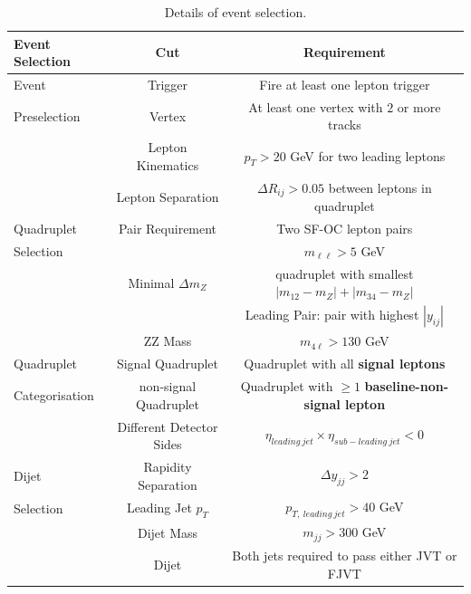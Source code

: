 \begin{table}[!htbp]
    \centering
        \caption{Details of event selection.\label{tab:EventSelection}}
        \begin{tabular}{|| l || c | c ||}
        \hline
        Event Selection         & Cut                   & Requirement                                                       \\
        \hline\hline
        Event               & Trigger                   &  Fire at least one lepton trigger                                     \\
        Preselection                & Vertex                    & At least one vertex with $2$ or more tracks                               \\
        \hline  
                    & Lepton Kinematics         & $p_{T} > 20$ GeV for two leading leptons                     \\
                    & Lepton Separation         & $\Delta R_{ij} > 0.05$ between leptons in quadruplet      \\
        Quadruplet  & Pair Requirement          & Two SF-OC lepton pairs                                            \\
        Selection   &                       & $m_{\ell\ell} > 5$ GeV                                    \\
                    & Minimal $\Delta m_{Z}$    & quadruplet with smallest $|m_{12} - m_{Z} | + |m_{34} - m_{Z} |$\\
                    &                       & Leading Pair: pair with highest $|y_{ij}|$                        \\
                    & ZZ Mass               & $m_{4\ell} > 130 $ GeV                                            \\
        \hline  
        Quadruplet          & Signal Quadruplet         & Quadruplet with all \textbf{signal leptons}                           \\
        Categorisation          & non-signal Quadruplet         & Quadruplet with $\geq 1$ \textbf{baseline-non-signal lepton}          \\
        \hline  
                    & Different Detector Sides      & $\eta_{leading~jet} \times \eta_{sub-leading~jet} < 0 $          \\
        Dijet       & Rapidity Separation       & $ \Delta y_{jj}> 2 $                                              \\
        Selection   & Leading Jet $p_{T}$   &   $p_{T,~leading~jet} > 40$ GeV               \\
                    & Dijet Mass                & $m_{jj} > 300 $ GeV                                                   \\
                    & Dijet         & Both jets required to pass either JVT or FJVT                             \\
        \hline  
                            

\end{tabular}
\end{table}
